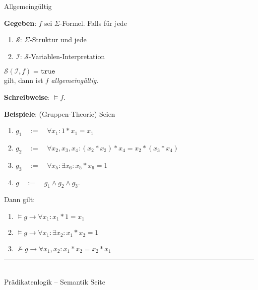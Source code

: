 \documentclass{slides}
\newcommand{\myrule}{\rule{20cm}{1mm}\\ }
\newcommand{\struct}{\mathcal{S}}
\newcounter{mypage}
\begin{document}
\begin{slide}{}
\normalsize

\begin{center}
Allgemeingültig
\end{center}
\vspace{0.5cm}

\footnotesize
\textbf{Gegeben}: $f$ sei $\Sigma$-Formel. Falls für jede
\begin{enumerate}
\item $\struct$: \quad  $\Sigma$-Struktur und jede
\item  $\mathcal{I}$: \quad $\struct$-Variablen-Interpretation
\end{enumerate}
\hspace*{1.3cm} $\struct(\mathcal{I}, f) = \mathtt{true}$ \\[0.3cm]
gilt, dann ist  $f$  \emph{allgemeingültig}.  

\textbf{Schreibweise}:
\hspace*{1.3cm} $\models f$. 

\textbf{Beispiele}: (Gruppen-Theorie) Seien
\begin{enumerate}
  \item $g_1 \quad := \quad \forall x_1: 1 * x_1 = x_1$
  \item $g_2 \quad := \quad \forall x_2, x_3, x_4: (x_2 * x_3) * x_4 = x_2 * (x_3 * x_4)$
  \item $g_3 \quad := \quad \forall x_5: \exists x_6: x_5 * x_6 = 1$
  \item $g \quad := \quad g_1 \wedge g_2 \wedge g_3$.
\end{enumerate}
Dann gilt:
\begin{enumerate}
\item $\models g \rightarrow \forall x_{1}: x_{1} * 1 = x_{1}$
\item $\models g \rightarrow \forall x_{1}: \exists x_{2}: x_{1} * x_{2} = 1$
\item $\not\models g \rightarrow \forall x_{1}, x_{2}: x_{1} * x_{2} = x_{2} * x_{1}$
\end{enumerate}

\vspace*{\fill}
\tiny \addtocounter{mypage}{1}
\myrule
Prädikatenlogik -- Semantik  \hspace*{\fill} Seite 
\end{slide}

\end{document}
